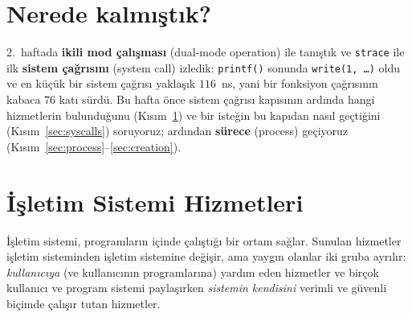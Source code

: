 \documentclass[11pt,a4paper]{article}
\newcommand{\term}[1]{\textbf{\color{mintdeep}#1}}
\newcommand{\cmd}[1]{\texttt{#1}}
\begin{document}
\setcounter{tocdepth}{1}
\tableofcontents

\section*{Nerede kalmıştık?}
2.~haftada \term{ikili mod çalışması} (dual-mode operation) ile tanıştık ve \cmd{strace} ile ilk \term{sistem çağrısını} (system call) izledik: \cmd{printf()} sonunda \cmd{write(1, \dots)} oldu ve en küçük bir sistem çağrısı yaklaşık $116$~ns, yani bir fonksiyon çağrısının kabaca $76$ katı sürdü. Bu hafta önce sistem çağrısı kapısının ardında hangi hizmetlerin bulunduğunu (Kısım~\ref{sec:services}) ve bir isteğin bu kapıdan nasıl geçtiğini (Kısım~\ref{sec:syscalls}) soruyoruz; ardından \term{sürece} (process) geçiyoruz (Kısım~\ref{sec:process}--\ref{sec:creation}).

\section{İşletim Sistemi Hizmetleri}
\label{sec:services}

İşletim sistemi, programların içinde çalıştığı bir ortam sağlar. Sunulan hizmetler işletim sisteminden işletim sistemine değişir, ama yaygın olanlar iki gruba ayrılır: \emph{kullanıcıya} (ve kullanıcının programlarına) yardım eden hizmetler ve birçok kullanıcı ve program sistemi paylaşırken \emph{sistemin kendisini} verimli ve güvenli biçimde çalışır tutan hizmetler.
\end{document}
